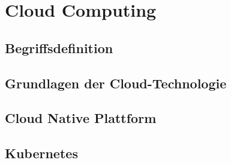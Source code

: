 \newpage
\section{Cloud Computing}
\subsection{Begriffsdefinition}
\subsection{Grundlagen der Cloud-Technologie}
\subsection{Cloud Native Plattform}
\subsection{Kubernetes}

